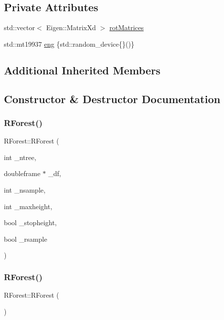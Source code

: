 \subsection*{Private Attributes}
\begin{DoxyCompactItemize}
\item 
std\+::vector$<$ Eigen\+::\+Matrix\+Xd $>$ \hyperlink{classRForest_a2b03a249697e9a68362455a6be8b1762}{rot\+Matrices}
\item 
std\+::mt19937 \hyperlink{classRForest_ae42cae6b10ed270d226dc2871a1b4c5a}{eng} \{std\+::random\+\_\+device\{\}()\}
\end{DoxyCompactItemize}
\subsection*{Additional Inherited Members}


\subsection{Constructor \& Destructor Documentation}
\mbox{\label{classRForest_a3314b007aa19d928f56f4bbaf35fae10}} 
\subsubsection{\texorpdfstring{R\+Forest()}{RForest()}\hspace{0.1cm}{\footnotesize\ttfamily [1/2]}}
{\footnotesize\ttfamily R\+Forest\+::\+R\+Forest (\begin{DoxyParamCaption}\item[{int}]{\+\_\+ntree,  }\item[{doubleframe $\ast$}]{\+\_\+df,  }\item[{int}]{\+\_\+nsample,  }\item[{int}]{\+\_\+maxheight,  }\item[{bool}]{\+\_\+stopheight,  }\item[{bool}]{\+\_\+rsample }\end{DoxyParamCaption})\hspace{0.3cm}{\ttfamily [inline]}}

\mbox{\label{classRForest_a6058c1b7beb5c90e59e558847b8650f6}} 
\subsubsection{\texorpdfstring{R\+Forest()}{RForest()}\hspace{0.1cm}{\footnotesize\ttfamily [2/2]}}
{\footnotesize\ttfamily R\+Forest\+::\+R\+Forest (\begin{DoxyParamCaption}{ }\end{DoxyParamCaption})\hspace{0.3cm}{\ttfamily [inline]}}

